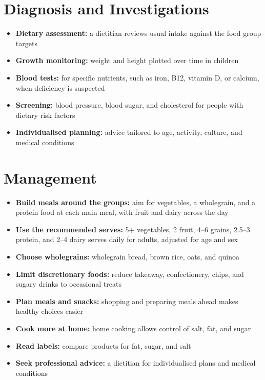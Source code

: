 \section*{Diagnosis and Investigations}
\begin{itemize}
    \item \textbf{Dietary assessment:} a dietitian reviews usual intake against the food group targets
    \item \textbf{Growth monitoring:} weight and height plotted over time in children
    \item \textbf{Blood tests:} for specific nutrients, such as iron, B12, vitamin D, or calcium, when deficiency is suspected
    \item \textbf{Screening:} blood pressure, blood sugar, and cholesterol for people with dietary risk factors
    \item \textbf{Individualised planning:} advice tailored to age, activity, culture, and medical conditions
\end{itemize}

\section*{Management}
\begin{itemize}
    \item \textbf{Build meals around the groups:} aim for vegetables, a wholegrain, and a protein food at each main meal, with fruit and dairy across the day
    \item \textbf{Use the recommended serves:} 5+ vegetables, 2 fruit, 4--6 grains, 2.5--3 protein, and 2--4 dairy serves daily for adults, adjusted for age and sex
    \item \textbf{Choose wholegrains:} wholegrain bread, brown rice, oats, and quinoa
    \item \textbf{Limit discretionary foods:} reduce takeaway, confectionery, chips, and sugary drinks to occasional treats
    \item \textbf{Plan meals and snacks:} shopping and preparing meals ahead makes healthy choices easier
    \item \textbf{Cook more at home:} home cooking allows control of salt, fat, and sugar
    \item \textbf{Read labels:} compare products for fat, sugar, and salt
    \item \textbf{Seek professional advice:} a dietitian for individualised plans and medical conditions
\end{itemize}

